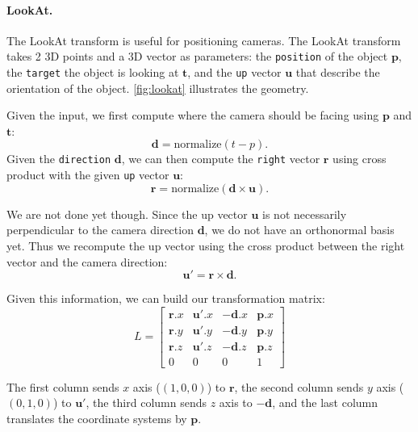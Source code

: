 \paragraph{LookAt.} The LookAt transform is useful for positioning cameras. The LookAt transform takes 2 3D points and a 3D vector as parameters: the \lstinline{position} of the object $\mathbf{p}$, the \lstinline{target} the object is looking at $\mathbf{t}$, and the \lstinline{up} vector $\mathbf{u}$ that describe the orientation of the object. \cref{fig:lookat} illustrates the geometry.

Given the input, we first compute where the camera should be facing using $\mathbf{p}$ and $\mathbf{t}$:
\begin{equation}
\mathbf{d} = \text{normalize}(t - p).
\end{equation} 
Given the \lstinline{direction} $\mathbf{d}$, we can then compute the \lstinline{right} vector $\mathbf{r}$ using cross product with the given \lstinline{up} vector $\mathbf{u}$:
\begin{equation}
\mathbf{r} = \text{normalize}\left(\mathbf{d} \times \mathbf{u}\right).
\end{equation}

We are not done yet though. Since the up vector $\mathbf{u}$ is not necessarily perpendicular to the camera direction $\mathbf{d}$, we do not have an orthonormal basis yet. Thus we recompute the up vector using the cross product between the right vector and the camera direction:
\begin{equation}
\mathbf{u}' = \mathbf{r} \times \mathbf{d}.
\end{equation}

Given this information, we can build our transformation matrix:
\begin{equation}
L = 
\begin{bmatrix}
\mathbf{r}.x & \mathbf{u}'.x & -\mathbf{d}.x & \mathbf{p}.x \\
\mathbf{r}.y & \mathbf{u}'.y & -\mathbf{d}.y & \mathbf{p}.y \\
\mathbf{r}.z & \mathbf{u}'.z & -\mathbf{d}.z & \mathbf{p}.z \\
0 & 0 & 0 & 1 
\end{bmatrix}
\end{equation}

The first column sends $x$ axis ($(1, 0, 0)$) to $\mathbf{r}$, the second column sends $y$ axis ($(0, 1, 0)$) to $\mathbf{u}'$, the third column sends $z$ axis to $-\mathbf{d}$, and the last column translates the coordinate systems by $\mathbf{p}$.

